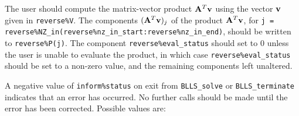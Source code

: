 \documentclass{galahad}
\newcommand{\packagename}{BLLS}
\begin{document}
\begin{description}
 The user should compute the matrix-vector product ${\mathbf{A}}^T {\mathbf{v}}$
     using the vector ${\mathbf{v}}$ given in {\tt reverse\%V}. The components
     $({\mathbf{A}}^T {\mathbf{v}})_j$ of the product ${\mathbf{A}}^T {\mathbf{v}}$, for
     {\tt j = reverse\%NZ\_in(reverse\%nz\_in\_start:reverse\%nz\_in\_end)},
     should be written to {\tt reverse\%P(j)}.
     The component {\tt reverse\%eval\_status} should set to 0 unless the
     user is unable to evaluate the product, in which case
     {\tt reverse\%eval\_status} should be set to a non-zero value, and the
      remaining components left unaltered.
\end{description}




\galerrors
A negative value of {\tt inform\%status} on exit from
{\tt \packagename\_solve}
or
{\tt \packagename\_terminate}
indicates that an error has occurred. No further calls should be made
until the error has been corrected. Possible values are:
\end{document}
